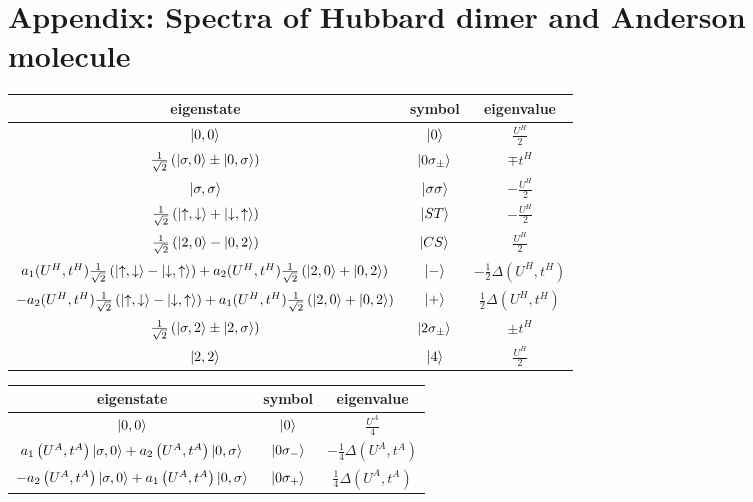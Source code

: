 \documentclass[12pt]{article}
\numberwithin{equation}{section}
\begin{document}
\section*{Appendix: Spectra of Hubbard dimer and Anderson molecule}
\begin{center}
	\begin{tabular}{|c|c|c|}
	\hline
	eigenstate & symbol & eigenvalue \\
	\hline
	$\ket{0,0}$ & $\ket{0}$ & \( \frac{U^H}{2}\)\\
	$ \frac{1}{\sqrt 2}\left(\ket{\sigma,0} \pm \ket{0,\sigma}\right)$ & $\ket{0\sigma_\pm}$ & \(\mp t^H\)\\
	$\ket{\sigma,\sigma}$ & $\ket{\sigma\sigma}$ & \( -\frac{U^H}{2}\)\\
	$ \frac{1}{\sqrt 2}\left(\ket{\uparrow,\downarrow} + \ket{\downarrow,\uparrow}\right)$ & $\ket{ST}$ & \( -\frac{U^H}{2}\)\\
	$ \frac{1}{\sqrt 2}\left(\ket{2,0} - \ket{0,2}\right)$ & $\ket{CS}$ & \( \frac{U^H}{2}\)\\
	$a_1(U^H, t^H) \frac{1}{\sqrt 2}\left(\ket{\uparrow,\downarrow} - \ket{\downarrow,\uparrow}\right) + a_2(U^H, t^H)\frac{1}{\sqrt 2}\left(\ket{2,0} + \ket{0,2}\right)$ & $\ket{-}$ & \(-\frac{1}{2}\Delta(U^H, t^H)\)\\
	$-a_2(U^H, t^H) \frac{1}{\sqrt 2}\left(\ket{\uparrow,\downarrow} - \ket{\downarrow,\uparrow}\right) + a_1(U^H, t^H)\frac{1}{\sqrt 2}\left(\ket{2,0} + \ket{0,2}\right)$ & $\ket{+}$ & \(\frac{1}{2}\Delta(U^H, t^H)\)\\
	$ \frac{1}{\sqrt 2}\left(\ket{\sigma,2} \pm \ket{2,\sigma}\right)$ & $\ket{2\sigma_\pm}$ & \(\pm t^H\)\\
	$\ket{2,2}$ & $\ket{4}$ & \( \frac{U^H}{2}\)\\
\hline
	\end{tabular}
	\label{hubb_dim_spectrum}
	\begin{tabular}{|c|c|c|}
	\hline
	eigenstate & symbol & eigenvalue\\
	\hline
	\(\ket{0,0}\) & \(\ket{0}\) & \(\frac{U^A}{4}\)\\
	\(a_1\left(U^A, t^A\right)\ket{\sigma,0} + a_2\left(U^A, t^A\right)\ket{0, \sigma}\) & \(\ket{0\sigma_-}\) & \(-\frac{1}{4}\Delta(U^A, t^A)\)\\
	\(-a_2\left(U^A, t^A\right)\ket{\sigma,0} + a_1\left(U^A, t^A\right)\ket{0, \sigma}\) & \(\ket{0\sigma_+}\) & \(\frac{1}{4}\Delta(U^A, t^A)\)\\

\end{tabular}
\end{center}
\end{document}
